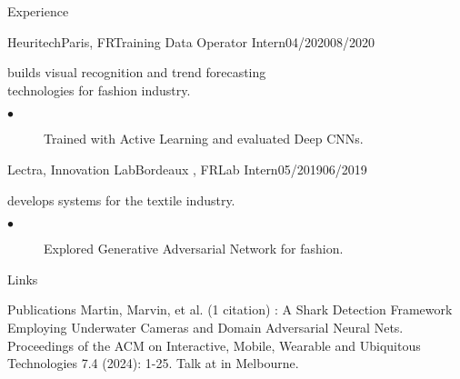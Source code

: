 \documentclass{resume}
\begin{document}
\begin{multicols}{2}
\begin{rSection}{\Large Experience}
		\begin{job}{Heuritech}{Paris, FR}{Training Data Operator Intern}{04/2020}{08/2020}{
			builds visual recognition and trend forecasting \\ technologies for fashion industry.
			\begin{description}
				\item[$\bullet$] Trained with Active Learning and evaluated Deep CNNs.
			\end{description}
		}
		\end{job}
		\begin{job}{Lectra, Innovation Lab}{Bordeaux , FR}{Lab Intern}{05/2019}{06/2019}{
			develops systems for the textile industry.
			\begin{description}
				\item[$\bullet$] Explored Generative Adversarial Network for fashion.
			\end{description}
		}
		\end{job}
	\end{rSection}
	
	\columnbreak
	
	\begin{rSection}{\Large Links}
	\end{rSection}
	
	\begin{rSection}{\Large Publications}
	Martin, Marvin, et al. (1 citation) : A Shark Detection Framework Employing Underwater Cameras and Domain Adversarial Neural Nets. Proceedings of the ACM on Interactive, Mobile, Wearable and Ubiquitous Technologies 7.4 (2024): 1-25. Talk at in Melbourne.
	\end{rSection}


\end{multicols}
\end{document}
